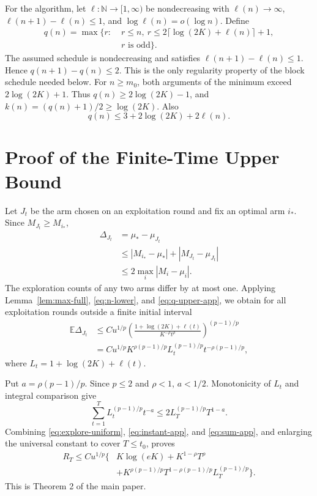 \documentclass[twoside]{article}
\newcommand{\E}{\mathbb E}
\begin{document}
For the algorithm, let $\ell:\mathbb N\to[1,\infty)$ be nondecreasing with
$\ell(n)\to\infty$, $\ell(n+1)-\ell(n)\leq1$, and
$\log\ell(n)=o(\log n)$. Define
\begin{align*}
 q(n)=\max\{r:\;&r\leq n,\ r\leq
 2\lceil\log(2K)+\ell(n)\rceil+1,\\
 &r\text{ is odd}\}.
\end{align*}
The assumed schedule is nondecreasing and satisfies
$\ell(n+1)-\ell(n)\leq1$. Hence $q(n+1)-q(n)\leq2$. This is the only
regularity property of the block schedule needed below.
For $n\geq m_0$, both arguments of the minimum exceed
$2\log(2K)+1$. Thus $q(n)\geq2\log(2K)-1$, and
$k(n)=(q(n)+1)/2\geq\log(2K)$. Also
\begin{equation}
 q(n)\leq3+2\log(2K)+2\ell(n).
 \label{eq:q-upper-app}
\end{equation}

\section{Proof of the Finite-Time Upper Bound}
\label{app:upper}

Let $J_t$ be the arm chosen on an exploitation round and fix an optimal arm
$i_*$. Since $M_{J_t}\geq M_{i_*}$,
\begin{align}
 \Delta_{J_t}
 &=\mu_*-\mu_{J_t}\nonumber\\
 &\leq|M_{i_*}-\mu_*|+|M_{J_t}-\mu_{J_t}|\nonumber\\
 &\leq2\max_i|M_i-\mu_i|.
 \label{eq:leader-app}
\end{align}
The exploration counts of any two arms differ by at most one. Applying
Lemma~\ref{lem:max-full}, \eqref{eq:n-lower}, and
\eqref{eq:q-upper-app}, we obtain for all exploitation rounds outside a
finite initial interval
\begin{align}
 \E\Delta_{J_t}
 &\leq C u^{1/p}
 \left(\frac{1+\log(2K)+\ell(t)}{K^{-\rho}t^\rho}
 \right)^{(p-1)/p}\nonumber\\
 &=C u^{1/p}K^{\rho(p-1)/p}
 L_t^{(p-1)/p}t^{-\rho(p-1)/p},
 \label{eq:instant-app}
\end{align}
where $L_t=1+\log(2K)+\ell(t)$.

Put $a=\rho(p-1)/p$. Since $p\leq2$ and $\rho<1$, $a<1/2$. Monotonicity of
$L_t$ and integral comparison give
\begin{equation}
 \sum_{t=1}^T L_t^{(p-1)/p}t^{-a}
 \leq2L_T^{(p-1)/p}T^{1-a}.
 \label{eq:sum-app}
\end{equation}
Combining \eqref{eq:explore-uniform}, \eqref{eq:instant-app}, and
\eqref{eq:sum-app}, and enlarging the universal constant to cover
$T\leq t_0$, proves
\begin{align*}
 R_T\leq C u^{1/p}\big\{&K\log(eK)+K^{1-\rho}T^\rho\\
 &+K^{\rho(p-1)/p}T^{1-\rho(p-1)/p}
 L_T^{(p-1)/p}\big\}.
\end{align*}
This is Theorem 2 of the main paper.
\end{document}
